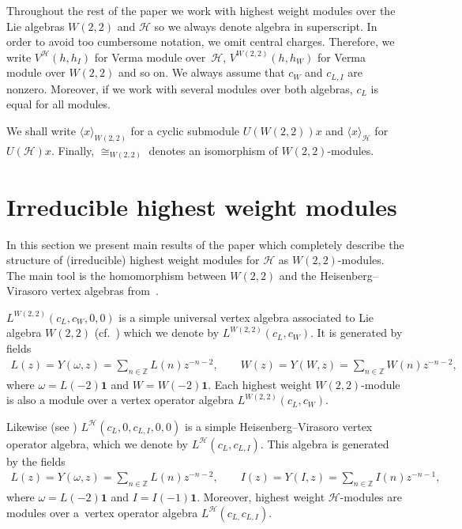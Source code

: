 \documentclass[11pt]{article}
\numberwithin{equation}{section}
\newcommand{\Z}{\mathbb Z}
\newcommand{\HVir}{\mathcal H}
\begin{document}
\begin{Remark}
Throughout the rest of the paper we work with highest weight modules over the Lie algebras $W(2,2)$ and $\HVir$ so we always denote algebra in superscript. In order to avoid too cumbersome notation, we omit central charges. Therefore, we write $V^{\HVir}(h,h_{I}) $ for Verma module over~$\HVir$, ${V}^{W(2,2)}(h,h_{W}) $ for Verma module over $W(2,2)$ and so on. We always assume that $c_{W}$ and $c_{L,I}$ are nonzero. Moreover, if we work with several modules over both algebras, $c_{L}$ is equal for all modules.

We shall write $\langle x \rangle_{W(2,2)}$ for a cyclic submodule $U (W(2,2))x$ and $\langle x \rangle_{\HVir}$ for $U(\HVir)x$. Finally, $\cong_{W(2,2)}$ denotes an isomorphism of $W(2,2)$-modules.
\end{Remark}

\section{Irreducible highest weight modules}\label{result}
In this section we present main results of the paper which completely describe the structure of (irreducible) highest weight modules for $\HVir$ as $W(2,2)$-modules. The main tool is the homomorphism between $W(2,2)$ and the Heisenberg--Virasoro vertex algebras from~\cite{nas}.

$L^{W(2,2) }( c_{L},c_{W},0,0) $ is a simple universal vertex algebra associated to Lie algebra $W(2,2)$ (cf.\ \cite{R-JMP, Zhang-Dong}) which we denote by $L^{W(2,2)}(c_{L},c_{W})$. It is generated by f\/ields
\begin{gather*}
L(z)=Y(\omega ,z)=\sum_{n\in {\Z}}L(n)z^{-n-2},\qquad W(z)=Y(W,z)=\sum_{n\in {\Z}}W(n)z^{-n-2},
\end{gather*}
where $\omega =L(-2)\mathbf{1}$ and $W=W(-2)\mathbf{1}$. Each highest weight $W(2,2) $-module is also a module over a vertex operator algebra $L^{W(2,2) }(c_{L},c_{W})$.

Likewise (see \cite{Billig3}) $L^{\HVir}(c_{L},0,c_{L,I},0,0) $ is a simple Heisenberg--Virasoro vertex operator algebra, which we denote by $L^{\HVir}(c_{L},c_{L,I}) $. This algebra is generated by the f\/ields
\begin{gather*}
L(z)=Y(\omega ,z)=\sum_{n\in {\Z}}L(n)z^{-n-2},\qquad I(z)=Y(I,z)=\sum_{n\in {\Z}}I(n)z^{-n-1},
\end{gather*}
where $\omega =L(-2)\mathbf{1}$ and $I=I(-1)\mathbf{1}$. Moreover, highest weight $\HVir$-modules are modules over a~vertex operator algebra
$L^{\HVir}(c_{L,}c_{L,I})$.
\end{document}
